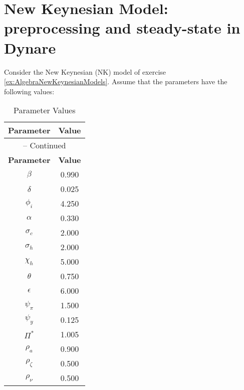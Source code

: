 \section[New Keynesian Model: preprocessing and steady-state in Dynare]{New Keynesian Model: preprocessing and steady-state in Dynare\label{ex:NewKeynesianModelPreprocessSteady}}
Consider the New Keynesian (NK) model of exercise \ref{ex:AlgebraNewKeynesianModels}.
Assume that the parameters have the following values:
    \begin{longtable}{cc}
      \caption{Parameter Values}\\%
      \toprule%
      \multicolumn{1}{c}{\textbf{Parameter}} &
      \multicolumn{1}{c}{\textbf{Value}} \\%
      \midrule%
      \endfirsthead
      \multicolumn{2}{c}{{\tablename} \thetable{} -- Continued}\\%
      \midrule%
      \multicolumn{1}{c}{\textbf{Parameter}} &
      \multicolumn{1}{c}{\textbf{Value}} \\%
      \midrule%
      \endhead
      ${\beta}$ 	 & 	 0.990\\
      ${\delta}$   &   0.025\\
      ${\phi_i}$   &   4.250 \\
      ${\alpha}$   &   0.330\\
      ${\sigma_c}$ 	 & 	 2.000\\
      ${\sigma_h}$ 	 & 	 2.000\\
      $\chi_h$       & 5.000\\
      ${\theta}$ 	 & 	 0.750\\
      ${\epsilon}$ 	 & 	 6.000\\
      ${\psi_{\pi}}$ 	 & 	 1.500\\
      ${\psi_{y}}$ 	 & 	 0.125\\
      ${\Pi^*}$ 	 & 	 1.005\\
      ${\rho_a}$ 	 & 	 0.900\\
      ${\rho_\zeta}$ 	 & 	 0.500\\
      ${\rho_{\nu}}$ 	 & 	 0.500\\
      \bottomrule%
      \end{longtable}

